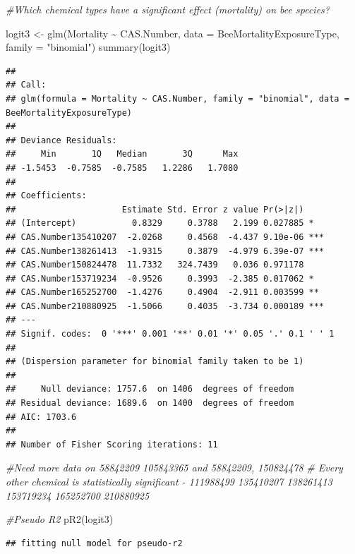 \documentclass[
  12pt,
]{article}
\newenvironment{Shaded}{\begin{snugshade}}{\end{snugshade}}
\newcommand{\AttributeTok}[1]{\textcolor[rgb]{0.77,0.63,0.00}{#1}}
\newcommand{\CommentTok}[1]{\textcolor[rgb]{0.56,0.35,0.01}{\textit{#1}}}
\newcommand{\FunctionTok}[1]{\textcolor[rgb]{0.00,0.00,0.00}{#1}}
\newcommand{\NormalTok}[1]{#1}
\newcommand{\OtherTok}[1]{\textcolor[rgb]{0.56,0.35,0.01}{#1}}
\newcommand{\SpecialCharTok}[1]{\textcolor[rgb]{0.00,0.00,0.00}{#1}}
\newcommand{\StringTok}[1]{\textcolor[rgb]{0.31,0.60,0.02}{#1}}
\begin{document}
\begin{Shaded}
\begin{Highlighting}[]
\CommentTok{\#Which chemical types have a significant effect (mortality) on bee species?}

\NormalTok{logit3 }\OtherTok{\textless{}{-}} \FunctionTok{glm}\NormalTok{(Mortality }\SpecialCharTok{\textasciitilde{}}\NormalTok{ CAS.Number, }\AttributeTok{data =}\NormalTok{ BeeMortalityExposureType, }\AttributeTok{family =} \StringTok{"binomial"}\NormalTok{)}
\FunctionTok{summary}\NormalTok{(logit3)}
\end{Highlighting}
\end{Shaded}

\begin{verbatim}
## 
## Call:
## glm(formula = Mortality ~ CAS.Number, family = "binomial", data = BeeMortalityExposureType)
## 
## Deviance Residuals: 
##     Min       1Q   Median       3Q      Max  
## -1.5453  -0.7585  -0.7585   1.2286   1.7080  
## 
## Coefficients:
##                     Estimate Std. Error z value Pr(>|z|)    
## (Intercept)           0.8329     0.3788   2.199 0.027885 *  
## CAS.Number135410207  -2.0268     0.4568  -4.437 9.10e-06 ***
## CAS.Number138261413  -1.9315     0.3879  -4.979 6.39e-07 ***
## CAS.Number150824478  11.7332   324.7439   0.036 0.971178    
## CAS.Number153719234  -0.9526     0.3993  -2.385 0.017062 *  
## CAS.Number165252700  -1.4276     0.4904  -2.911 0.003599 ** 
## CAS.Number210880925  -1.5066     0.4035  -3.734 0.000189 ***
## ---
## Signif. codes:  0 '***' 0.001 '**' 0.01 '*' 0.05 '.' 0.1 ' ' 1
## 
## (Dispersion parameter for binomial family taken to be 1)
## 
##     Null deviance: 1757.6  on 1406  degrees of freedom
## Residual deviance: 1689.6  on 1400  degrees of freedom
## AIC: 1703.6
## 
## Number of Fisher Scoring iterations: 11
\end{verbatim}

\begin{Shaded}
\begin{Highlighting}[]
 \CommentTok{\#Need more data on 58842209 105843365 and 58842209, 150824478}
 \CommentTok{\# Every other chemical is statistically significant {-} 111988499 135410207 138261413  153719234 165252700 210880925 }

\CommentTok{\#Pseudo R2}
 \FunctionTok{pR2}\NormalTok{(logit3)}
\end{Highlighting}
\end{Shaded}

\begin{verbatim}
## fitting null model for pseudo-r2
\end{verbatim}
\end{document}
